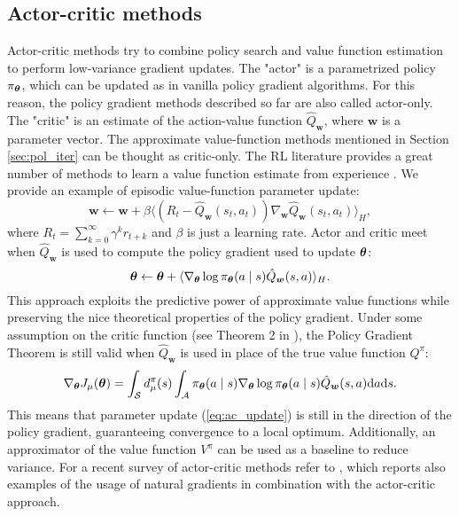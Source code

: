 \subsection{Actor-critic methods}
Actor-critic methods try to combine policy search and value function estimation to perform low-variance gradient updates. The "actor" is a parametrized policy $\pi_{\boldsymbol{\theta}}$, which can be updated as in vanilla policy gradient algorithms. For this reason, the policy gradient methods described so far are also called actor-only. The "critic" is an estimate of the action-value function $\hat{Q}_{\boldsymbol{w}}$, where $\boldsymbol{w}$ is a parameter vector. The approximate value-function methods mentioned in Section \ref{sec:pol_iter} can be thought as critic-only. The \ac{RL} literature provides a great number of methods to learn a value function estimate from experience \cite{Sutton:1998:IRL:551283}. We provide an example of episodic value-function parameter update:
\[
	\boldsymbol{w} \gets \boldsymbol{w} + \beta\langle
		(R_t-\hat{Q}_{\boldsymbol{w}}(s_t,a_t))
		\nabla_{\boldsymbol{w}}\hat{Q}_{\boldsymbol{w}}(s_t,a_t)\rangle_H,
\] 
where $R_t = \sum\limits_{k=0}^{\infty}\gamma^kr_{t+k}$ and $\beta$ is just a learning rate.
Actor and critic meet when $\hat{Q}_{\boldsymbol{w}}$ is used to compute the policy gradient used to update $\boldsymbol{\theta}$:
\begin{equation}\label{eq:ac_update} 
	\boldsymbol{\theta} \gets \boldsymbol{\theta} + \langle\nabla_{\boldsymbol{\theta}}\log\pi_{\boldsymbol{\theta}}(a \mid s) \hat{Q}_{\boldsymbol{w}}(s,a)\rangle_H.
\end{equation}
This approach exploits the predictive power of approximate value functions while preserving the nice theoretical properties of the policy gradient. Under some assumption on the critic function (see Theorem 2 in \cite{Sutton1999a}), the Policy Gradient Theorem is still valid when $\hat{Q}_{\boldsymbol{w}}$ is used in place of the true value function $Q^\pi$:
\[
	\nabla_{\boldsymbol{\theta}}J_\mu(\boldsymbol{\theta}) = \int_{\mathcal{S}}d_{\mu}^{\pi}(s)
		\int_{\mathcal{A}}\pi_{\boldsymbol{\theta}}(a \mid s)\nabla_{\boldsymbol{\theta}}\log\pi_{\boldsymbol{\theta}}(a \mid s)
		\hat{Q}_{\boldsymbol{w}}(s,a)\mathrm{d}a\mathrm{d}s.
\]
This means that parameter update (\ref{eq:ac_update}) is still in the direction of the policy gradient, guaranteeing convergence to a local optimum.
Additionally, an approximator of the value function $V^\pi$ can be used as a baseline to reduce variance.
For a recent survey of actor-critic methods refer to \cite{grondman2012survey}, which reports also examples of the usage of natural gradients in combination with the actor-critic approach.

